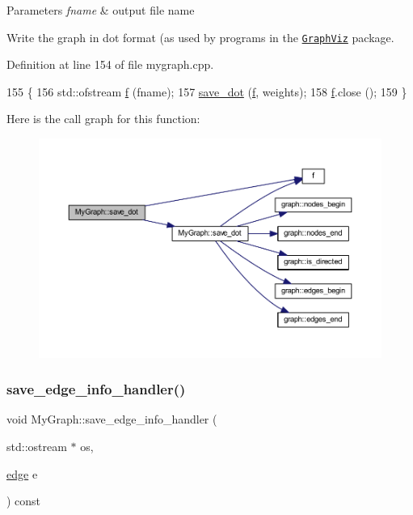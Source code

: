 \begin{DoxyParams}{Parameters}
{\em fname} & output file name\\
\hline
\end{DoxyParams}
Write the graph in dot format (as used by programs in the \href{http://www.research.att.com/sw/tools/graphviz/}{\tt Graph\+Viz} package. 

Definition at line 154 of file mygraph.\+cpp.


\begin{DoxyCode}
155 \{
156     std::ofstream \mbox{\hyperlink{rings_8cpp_a77369fc4d5326a16d2c603e032023528}{f}} (fname);
157     \mbox{\hyperlink{class_my_graph_acf68ca166eebb43a80b722c6ef15d22c}{save\_dot}} (\mbox{\hyperlink{rings_8cpp_a77369fc4d5326a16d2c603e032023528}{f}}, weights);
158     \mbox{\hyperlink{rings_8cpp_a77369fc4d5326a16d2c603e032023528}{f}}.close ();
159 \}
\end{DoxyCode}
Here is the call graph for this function\+:
\nopagebreak
\begin{figure}[H]
\begin{center}
\leavevmode
\includegraphics[width=350pt]{class_my_graph_a646cfd85f487b7f7b8fd9f074bd595ca_cgraph}
\end{center}
\end{figure}
\mbox{\label{class_my_graph_aa2c8ff76d5443d4788ecfebc8f799182}} 
\subsubsection{\texorpdfstring{save\+\_\+edge\+\_\+info\+\_\+handler()}{save\_edge\_info\_handler()}}
{\footnotesize\ttfamily void My\+Graph\+::save\+\_\+edge\+\_\+info\+\_\+handler (\begin{DoxyParamCaption}\item[{std\+::ostream $\ast$}]{os,  }\item[{\mbox{\hyperlink{classedge}{edge}}}]{e }\end{DoxyParamCaption}) const\hspace{0.3cm}{\ttfamily [virtual]}}

